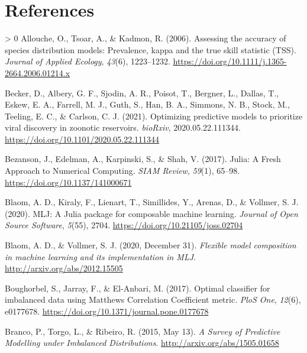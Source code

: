 \documentclass[11pt]{article}
\newlength{\cslhangindent}
\newenvironment{CSLReferences}[3] %
 {%
  \setlength{\parindent}{0pt}
  \ifodd #1 \everypar{\setlength{\hangindent}{\cslhangindent}}\ignorespaces\fi
  \ifnum #2 > 0
  \setlength{\parskip}{#2\baselineskip}
  \fi
 }%
 {}
\begin{document}
\hypertarget{references}{%
\section*{References}\label{references}}

\hypertarget{refs}{}
\begin{CSLReferences}{1}{0}
\leavevmode\hypertarget{ref-Allouche2006AssAcc}{}%
Allouche, O., Tsoar, A., \& Kadmon, R. (2006). Assessing the accuracy of
species distribution models: Prevalence, kappa and the true skill
statistic (TSS). \emph{Journal of Applied Ecology}, \emph{43}(6),
1223--1232. \url{https://doi.org/10.1111/j.1365-2664.2006.01214.x}

\leavevmode\hypertarget{ref-Becker2021OptPre}{}%
Becker, D., Albery, G. F., Sjodin, A. R., Poisot, T., Bergner, L.,
Dallas, T., Eskew, E. A., Farrell, M. J., Guth, S., Han, B. A., Simmons,
N. B., Stock, M., Teeling, E. C., \& Carlson, C. J. (2021). Optimizing
predictive models to prioritize viral discovery in zoonotic reservoirs.
\emph{bioRxiv}, 2020.05.22.111344.
\url{https://doi.org/10.1101/2020.05.22.111344}

\leavevmode\hypertarget{ref-Bezanson2017JulFre}{}%
Bezanson, J., Edelman, A., Karpinski, S., \& Shah, V. (2017). Julia: A
Fresh Approach to Numerical Computing. \emph{SIAM Review}, \emph{59}(1),
65--98. \url{https://doi.org/10.1137/141000671}

\leavevmode\hypertarget{ref-Blaom2020MljJul}{}%
Blaom, A. D., Kiraly, F., Lienart, T., Simillides, Y., Arenas, D., \&
Vollmer, S. J. (2020). MLJ: A Julia package for composable machine
learning. \emph{Journal of Open Source Software}, \emph{5}(55), 2704.
\url{https://doi.org/10.21105/joss.02704}

\leavevmode\hypertarget{ref-Blaom2020FleMod}{}%
Blaom, A. D., \& Vollmer, S. J. (2020, December 31). \emph{Flexible
model composition in machine learning and its implementation in MLJ}.
\url{http://arxiv.org/abs/2012.15505}

\leavevmode\hypertarget{ref-Boughorbel2017OptCla}{}%
Boughorbel, S., Jarray, F., \& El-Anbari, M. (2017). Optimal classifier
for imbalanced data using Matthews Correlation Coefficient metric.
\emph{PloS One}, \emph{12}(6), e0177678.
\url{https://doi.org/10.1371/journal.pone.0177678}

\leavevmode\hypertarget{ref-Branco2015SurPre}{}%
Branco, P., Torgo, L., \& Ribeiro, R. (2015, May 13). \emph{A Survey of
Predictive Modelling under Imbalanced Distributions}.
\url{http://arxiv.org/abs/1505.01658}


\end{CSLReferences}
\end{document}
